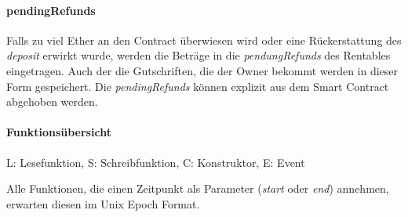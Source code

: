 \paragraph{pendingRefunds}
\label{sys_para:pendingRefunds}
Falls zu viel Ether an den Contract überwiesen wird oder eine Rückerstattung des \emph{deposit} erwirkt wurde, werden die Beträge in die \emph{pendungRefunds} des Rentables eingetragen. Auch der die Gutschriften, die der Owner bekommt werden in dieser Form gespeichert. Die \emph{pendingRefunds} können explizit aus dem Smart Contract abgehoben werden.\cite[Miscellaneous/Introduction to Smart Contracts]{solidity.readthedocs.io}

\paragraph{Funktionsübersicht}

L: Lesefunktion, S: Schreibfunktion, C: Konstruktor, E: Event

Alle Funktionen, die einen Zeitpunkt als Parameter (\emph{start} oder \emph{end}) annehmen, erwarten diesen im Unix Epoch Format.

